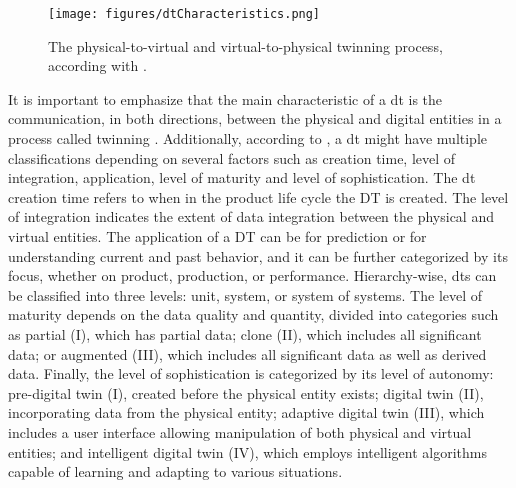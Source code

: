 \documentclass[preprint, review, 12pt]{elsarticle}
\begin{document}
\begin{figure}[htbp]
    \centering
    \texttt{[image: figures/dtCharacteristics.png]}
    \caption{The physical-to-virtual and virtual-to-physical twinning process, according with \cite{jones2020}.}
    \label{fig:dtCharacteristics}
\end{figure}

It is important to emphasize that the main characteristic of a \gls{dt} is the communication, in both directions, between the physical and digital entities in a process called twinning \cite{jones2020}. Additionally, according to \cite{singh2021}, a \gls{dt} might have multiple classifications depending on several factors such as creation time, level of integration, application, level of maturity and level of sophistication. The \gls{dt} creation time refers to when in the product life cycle the DT is created. The level of integration indicates the extent of data integration between the physical and virtual entities. The application of a DT can be for prediction or for understanding current and past behavior, and it can be further categorized by its focus, whether on product, production, or performance. Hierarchy-wise, \gls{dt}s can be classified into three levels: unit, system, or system of systems. The level of maturity depends on the data quality and quantity, divided into categories such as partial (I), which has partial data; clone (II), which includes all significant data; or augmented (III), which includes all significant data as well as derived data. Finally, the level of sophistication is categorized by its level of autonomy: pre-digital twin (I), created before the physical entity exists; digital twin (II), incorporating data from the physical entity; adaptive digital twin (III), which includes a user interface allowing manipulation of both physical and virtual entities; and intelligent digital twin (IV), which employs intelligent algorithms capable of learning and adapting to various situations.


\end{document}
